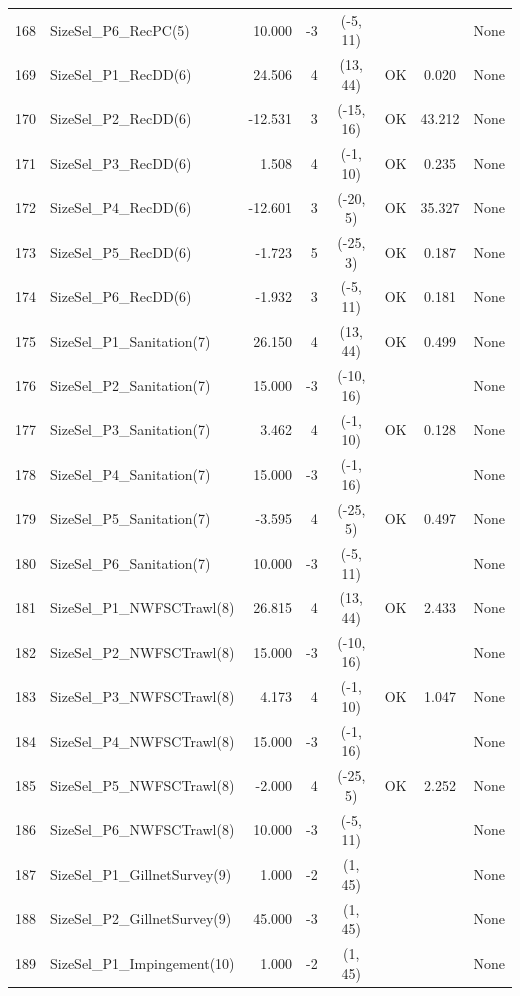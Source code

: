 \documentclass[12pt,]{article}
\begin{document}
\begin{landscape}
\begin{longtable}{rlrrcccl}
  168 & SizeSel\_P6\_RecPC(5) & 10.000 & -3 & (-5, 11) &  &  & None \\ 
  169 & SizeSel\_P1\_RecDD(6) & 24.506 & 4 & (13, 44) & OK & 0.020 & None \\ 
  170 & SizeSel\_P2\_RecDD(6) & -12.531 & 3 & (-15, 16) & OK & 43.212 & None \\ 
  171 & SizeSel\_P3\_RecDD(6) & 1.508 & 4 & (-1, 10) & OK & 0.235 & None \\ 
  172 & SizeSel\_P4\_RecDD(6) & -12.601 & 3 & (-20, 5) & OK & 35.327 & None \\ 
  173 & SizeSel\_P5\_RecDD(6) & -1.723 & 5 & (-25, 3) & OK & 0.187 & None \\ 
  174 & SizeSel\_P6\_RecDD(6) & -1.932 & 3 & (-5, 11) & OK & 0.181 & None \\ 
  175 & SizeSel\_P1\_Sanitation(7) & 26.150 & 4 & (13, 44) & OK & 0.499 & None \\ 
  176 & SizeSel\_P2\_Sanitation(7) & 15.000 & -3 & (-10, 16) &  &  & None \\ 
  177 & SizeSel\_P3\_Sanitation(7) & 3.462 & 4 & (-1, 10) & OK & 0.128 & None \\ 
  178 & SizeSel\_P4\_Sanitation(7) & 15.000 & -3 & (-1, 16) &  &  & None \\ 
  179 & SizeSel\_P5\_Sanitation(7) & -3.595 & 4 & (-25, 5) & OK & 0.497 & None \\ 
  180 & SizeSel\_P6\_Sanitation(7) & 10.000 & -3 & (-5, 11) &  &  & None \\ 
  181 & SizeSel\_P1\_NWFSCTrawl(8) & 26.815 & 4 & (13, 44) & OK & 2.433 & None \\ 
  182 & SizeSel\_P2\_NWFSCTrawl(8) & 15.000 & -3 & (-10, 16) &  &  & None \\ 
  183 & SizeSel\_P3\_NWFSCTrawl(8) & 4.173 & 4 & (-1, 10) & OK & 1.047 & None \\ 
  184 & SizeSel\_P4\_NWFSCTrawl(8) & 15.000 & -3 & (-1, 16) &  &  & None \\ 
  185 & SizeSel\_P5\_NWFSCTrawl(8) & -2.000 & 4 & (-25, 5) & OK & 2.252 & None \\ 
  186 & SizeSel\_P6\_NWFSCTrawl(8) & 10.000 & -3 & (-5, 11) &  &  & None \\ 
  187 & SizeSel\_P1\_GillnetSurvey(9) & 1.000 & -2 & (1, 45) &  &  & None \\ 
  188 & SizeSel\_P2\_GillnetSurvey(9) & 45.000 & -3 & (1, 45) &  &  & None \\ 
  189 & SizeSel\_P1\_Impingement(10) & 1.000 & -2 & (1, 45) &  &  & None \\ 

\end{longtable}
\end{landscape}
\end{document}
